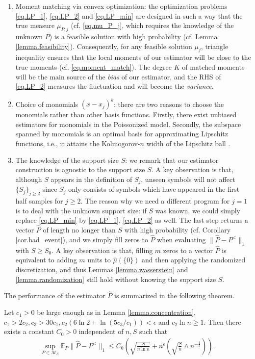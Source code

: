 \documentclass[final,12pt]{colt2018} %
\def \bE {\mathbb{E}}
\newcommand{\calM}{{\mathcal{M}}}
\begin{document}
\begin{enumerate}
	\item Moment matching via convex optimization: the optimization problems \eqref{eq.LP_1}, \eqref{eq.LP_2} and \eqref{eq.LP_min} are designed in such a way that the true measure $\mu_{P,j}$ (cf. \eqref{eq.mu_P_j}, which requires the knowledge of the unknown $P$) is a feasible solution with high probability (cf. Lemma \ref{lemma.feasibility}). Consequently, for any feasible solution $\mu_j$, triangle inequality ensures that the local moments of our estimator will be close to the true moments (cf. \eqref{eq.moment_match}). The degree $K$ of matched moments will be the main source of the \emph{bias} of our estimator, and the RHS of \eqref{eq.LP_2} measures the fluctuation and will become the \emph{variance}.
	\item Choice of monomials $(x-x_j)^k$: there are two reasons to choose the monomials rather than other basis functions. Firstly, there exist unbiased estimators for monomials in the Poissonized model. Secondly, the subspace spanned by monomials is an optimal basis for approximating Lipschitz functions, i.e., it attains the Kolmogorov-$n$ width of the Lipschitz ball \cite{lorentz1996constructive}.
	\item The knowledge of the support size $S$: we remark that our estimator construction is agnostic to the support size $S$. A key observation is that, although $S$ appears in the definition of $S_j$, unseen symbols will not affect $\{S_j\}_{j\ge 2}$ since $S_j$ only consists of symbols which have appeared in the first half samples for $j\ge 2$. The reason why we need a different program for $j=1$ is to deal with the unknown support size: if $S$ was known, we could simply replace \eqref{eq.LP_min} by \eqref{eq.LP_1}, \eqref{eq.LP_2} as well. The last step returns a vector $\hat{P}$ of length no longer than $S$ with high probability (cf. Corollary \ref{cor.bad_event}), and we simply fill zeros to $\hat{P}$ when evaluating $\|\hat{P}-P^<\|_1$ with $S\ge S_0$. A key observation is that, filling $m$ zeros to a vector $\hat{P}$ is equivalent to adding $m$ units to $\hat{\mu}(\{0\})$ and then applying the randomized discretization, and thus Lemmas \ref{lemma.wasserstein} and \ref{lemma.randomization} still hold without knowing the support size $S$. 
\end{enumerate}

The performance of the estimator $\hat{P}$ is summarized in the following theorem.
\begin{theorem}\label{thm.achievability}
	Let $c_1>0$ be large enough as in Lemma \ref{lemma.concentration}, $c_1>2c_2, c_3>30c_1, c_2(6\ln 2+\ln(5c_3/c_1))<\epsilon$ and $c_2\ln n\ge 1$. Then there exists a constant $C_0>0$ independent of $n,S$ such that
	\begin{align*}
	\sup_{P\in\calM_S} \bE_P \|\hat{P}-P^<\|_1 \le C_0\left(\sqrt{\frac{S}{n\ln n}} + n^{\epsilon}\left(\sqrt{\frac{S}{n}} \wedge n^{-\frac{1}{3}}\right)\right).
	\end{align*}
\end{theorem}
\end{document}
